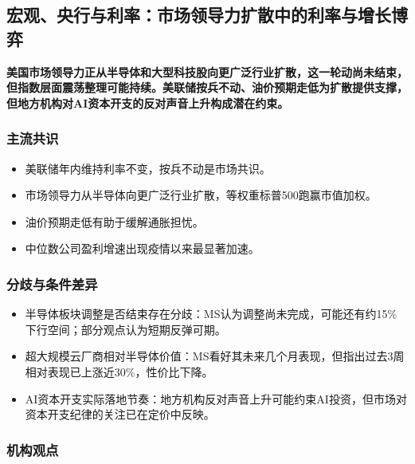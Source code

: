 \documentclass[11pt]{ctexart}
\begin{document}
\subsection{宏观、央行与利率：市场领导力扩散中的利率与增长博弈}
\textbf{美国市场领导力正从半导体和大型科技股向更广泛行业扩散，这一轮动尚未结束，但指数层面震荡整理可能持续。美联储按兵不动、油价预期走低为扩散提供支撑，但地方机构对AI资本开支的反对声音上升构成潜在约束。}
\subsubsection*{主流共识}
\begin{itemize}
  \item 美联储年内维持利率不变，按兵不动是市场共识。
  \item 市场领导力从半导体向更广泛行业扩散，等权重标普500跑赢市值加权。
  \item 油价预期走低有助于缓解通胀担忧。
  \item 中位数公司盈利增速出现疫情以来最显著加速。
\end{itemize}
\subsubsection*{分歧与条件差异}
\begin{itemize}
  \item 半导体板块调整是否结束存在分歧：MS认为调整尚未完成，可能还有约15\%下行空间；部分观点认为短期反弹可期。
  \item 超大规模云厂商相对半导体价值：MS看好其未来几个月表现，但指出过去3周相对表现已上涨近30\%，性价比下降。
  \item AI资本开支实际落地节奏：地方机构反对声音上升可能约束AI投资，但市场对资本开支纪律的关注已在定价中反映。
\end{itemize}
\subsubsection*{机构观点}
\end{document}
